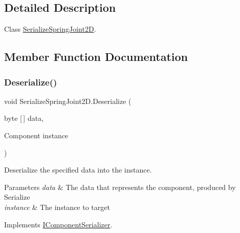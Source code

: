 \subsection{Detailed Description}
Class \hyperlink{class_serialize_spring_joint2_d}{Serialize\+Spring\+Joint2D}. 



\subsection{Member Function Documentation}
\mbox{\label{class_serialize_spring_joint2_d_aac148dbf74d0b00fff9983e677ed4a10}} 
\subsubsection{\texorpdfstring{Deserialize()}{Deserialize()}}
{\footnotesize\ttfamily void Serialize\+Spring\+Joint2\+D.\+Deserialize (\begin{DoxyParamCaption}\item[{byte \mbox{[}$\,$\mbox{]}}]{data,  }\item[{Component}]{instance }\end{DoxyParamCaption})\hspace{0.3cm}{\ttfamily [inline]}}



Deserialize the specified data into the instance. 


\begin{DoxyParams}{Parameters}
{\em data} & The data that represents the component, produced by Serialize\\
\hline
{\em instance} & The instance to target\\
\hline
\end{DoxyParams}


Implements \hyperlink{interface_i_component_serializer_a4cc366a5c78b33d47a90c209d8fed883}{I\+Component\+Serializer}.

\mbox{\label{class_serialize_spring_joint2_d_a74dc25a62ade31ed51b3f47d1097e5e7}} 
